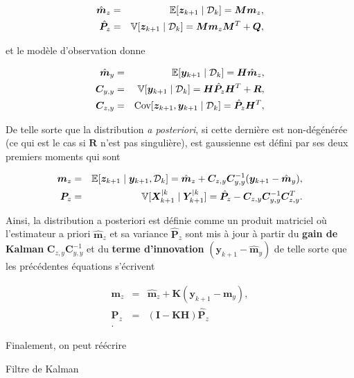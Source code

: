 \begin{eqnarray*}
    \hat{\bm{m}}_{z} &=& \mathbb{E} [\bm z_{k+1} \mid \mathcal D_k] = \bm M \bm m_z,\\
    \hat{\bm  P}_{z} &=& \mathbb{V} [\bm z_{k+1} \mid \mathcal D_k] = \bm M \bm m_z \bm M^T + \bm Q,
\end{eqnarray*}

et le modèle d'observation donne

\begin{eqnarray*}
    \hat{\bm{m}}_y &=& \mathbb{E} [\bm y_{k+1} \mid \mathcal D_k] = \bm H \hat{\bm{m}}_{z},\\
    \bm C_{y,y}&=&\mathbb{V} [\bm y_{k+1} \mid \mathcal D_k] = \bm H \hat{\bm  P}_{z} \bm H^T + \bm R, \\
    \bm C_{z,y} &=& \text{Cov}[\bm z_{k+1}, \bm y_{k+1}\mid \mathcal D_k] = \hat{\bm  P}_{z} \bm H^T,
\end{eqnarray*}

De telle sorte que la distribution \textit{a posteriori}, si cette dernière est non-dégénérée (ce qui est le cas si $\bm R$ n'est pas singulière), est gaussienne est défini par ses deux premiers moments qui sont

\begin{eqnarray*}
    \bm m_z &=& \mathbb{E}[\bm z_{k+1} \mid \bm y_{k+1},\mathcal D_k] = \hat{\bm{m}}_z + \bm C_{z,y} \bm C_{y,y}^{-1} (\bm y_{k+1} - \hat{\bm{m}}_y), \\
    \bm P_z &=& \mathbb{V}[\bm X^{\mid k}_{k+1} \mid \bm Y_{k+1}^{\mid k}] = \hat{\bm  P}_z - \bm C_{z,y} \bm C_{y,y}^{-1} \bm C_{z,y}^T.
\end{eqnarray*}

Ainsi, la distribution a posteriori est définie comme un produit matriciel où l'estimateur a priori $\hat{\bm{m}}_z$ et sa variance $\hat{\bm  P}_z$ sont mis à jour à partir du \textbf{gain de Kalman} $\bm C_{z,y} \bm C_{y,y}^{-1}$ et du \textbf{terme d'innovation} $(\bm y_{k+1} - \hat{\bm{m}}_y)$ de telle sorte que les précédentes équations s'écrivent

\begin{eqnarray*}
    \bm m_z &=& \hat{\bm{m}}_{z} + \bm K (\bm y_{k+1} - \bm m_y), \\
    \bm P_z &=& (\bm I - \bm K\bm H)\hat{\bm  P}_{z} \\.
\end{eqnarray*}

Finalement, on peut réécrire
\begin{algorithm}
    \caption{Filtre de Kalman}
\end{algorithm}

